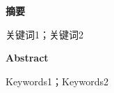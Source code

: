 \setcounter{page}{7}
\begin{center}
    \vspace{0.5ex}
    \bfseries 摘要
    \vspace{0.5ex}
\end{center}


\bullshit

关键词1；关键词2

\newpage
\setcounter{page}{9}

\begin{center}
    \vspace{0.5ex}
    \bfseries Abstract
    \vspace{0.5ex}
\end{center}

\bullshit

Keywords1；Keywords2